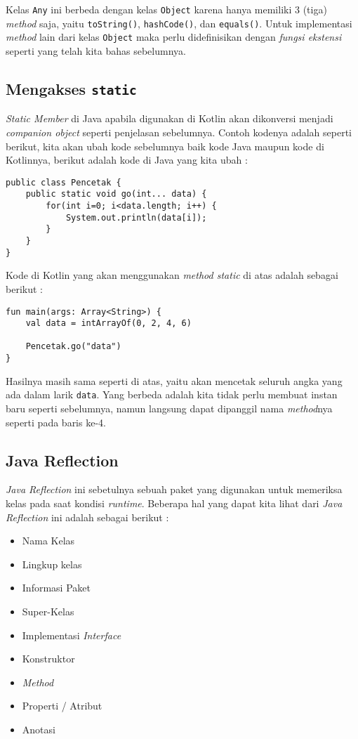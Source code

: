 Kelas \texttt{Any} ini berbeda dengan kelas \texttt{Object} karena hanya memiliki 3 (tiga) \textit{method} saja, yaitu \texttt{toString()}, \texttt{hashCode()}, dan \texttt{equals()}. Untuk implementasi \textit{method} lain dari kelas \texttt{Object} maka perlu didefinisikan dengan \textit{fungsi ekstensi} seperti yang telah kita bahas sebelumnya.

\subsection{Mengakses \texttt{static}}

\textit{Static Member} di Java apabila digunakan di Kotlin akan dikonversi menjadi \textit{companion object} seperti penjelasan sebelumnya. Contoh kodenya adalah seperti berikut, kita akan ubah kode sebelumnya baik kode Java maupun kode di Kotlinnya, berikut adalah kode di Java yang kita ubah :

\begin{lstlisting}
public class Pencetak {
	public static void go(int... data) {
		for(int i=0; i<data.length; i++) {
			System.out.println(data[i]);
		}
	}
}
\end{lstlisting}

Kode di Kotlin yang akan menggunakan \textit{method static} di atas adalah sebagai berikut :

\begin{lstlisting}
fun main(args: Array<String>) {
	val data = intArrayOf(0, 2, 4, 6)
	
	Pencetak.go("data")
}
\end{lstlisting}

Hasilnya masih sama seperti di atas, yaitu akan mencetak seluruh angka yang ada dalam larik \texttt{data}. Yang berbeda adalah kita tidak perlu membuat instan baru seperti sebelumnya, namun langsung dapat dipanggil nama \textit{method}nya seperti pada baris ke-4.

\subsection{Java Reflection}

\textit{Java Reflection} ini sebetulnya sebuah paket yang digunakan untuk memeriksa kelas pada saat kondisi \textit{runtime}. Beberapa hal yang dapat kita lihat dari \textit{Java Reflection} ini adalah sebagai berikut :

\begin{itemize}
	\item Nama Kelas
	\item Lingkup kelas
	\item Informasi Paket
	\item Super-Kelas
	\item Implementasi \textit{Interface}
	\item Konstruktor
	\item \textit{Method}
	\item Properti / Atribut
	\item Anotasi
\end{itemize}

